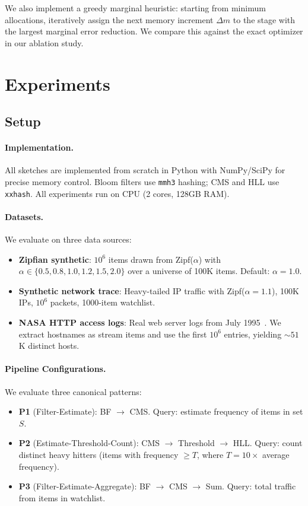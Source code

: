 \documentclass[preprint]{article}
\begin{document}
We also implement a greedy marginal heuristic: starting from minimum allocations, iteratively assign the next memory increment $\Delta m$ to the stage with the largest marginal error reduction. We compare this against the exact optimizer in our ablation study.

\section{Experiments}
\label{sec:experiments}

\subsection{Setup}

\paragraph{Implementation.}
All sketches are implemented from scratch in Python with NumPy/SciPy for precise memory control. Bloom filters use \texttt{mmh3} hashing; CMS and HLL use \texttt{xxhash}. All experiments run on CPU (2 cores, 128GB RAM).

\paragraph{Datasets.}
We evaluate on three data sources:
\begin{itemize}
    \item \textbf{Zipfian synthetic}: $10^6$ items drawn from Zipf($\alpha$) with $\alpha \in \{0.5, 0.8, 1.0, 1.2, 1.5, 2.0\}$ over a universe of 100K items. Default: $\alpha=1.0$.
    \item \textbf{Synthetic network trace}: Heavy-tailed IP traffic with Zipf($\alpha=1.1$), 100K IPs, $10^6$ packets, 1000-item watchlist.
    \item \textbf{NASA HTTP access logs}: Real web server logs from July 1995~\citep{nasa_http}. We extract hostnames as stream items and use the first $10^6$ entries, yielding ${\sim}51$K distinct hosts.
\end{itemize}

\paragraph{Pipeline Configurations.}
We evaluate three canonical patterns:
\begin{itemize}
    \item \textbf{P1} (Filter-Estimate): BF $\to$ CMS. Query: estimate frequency of items in set $S$.
    \item \textbf{P2} (Estimate-Threshold-Count): CMS $\to$ Threshold $\to$ HLL. Query: count distinct heavy hitters (items with frequency $\geq T$, where $T = 10\times$ average frequency).
    \item \textbf{P3} (Filter-Estimate-Aggregate): BF $\to$ CMS $\to$ Sum. Query: total traffic from items in watchlist.
\end{itemize}
\end{document}
